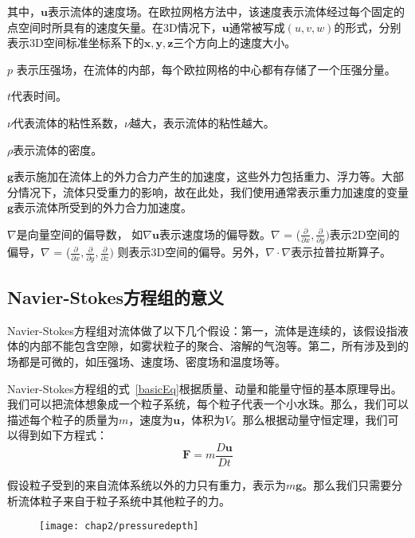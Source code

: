 其中，\(\boldsymbol u\)表示流体的速度场。在欧拉网格方法中，该速度表示流体经过每个固定的点空间时所具有的速度矢量。在3D情况下，\(\boldsymbol u\)通常被写成\((u,v,w)\)的形式，分别表示3D空间标准坐标系下的\(\boldsymbol{x}, \boldsymbol{y}, \boldsymbol{z}\)三个方向上的速度大小。
 
\(p\) 表示压强场，在流体的内部，每个欧拉网格的中心都有存储了一个压强分量。

\(t\)代表时间。
 
\(\nu\)代表流体的粘性系数，\(\nu\)越大，表示流体的粘性越大。
 
\(\rho\)表示流体的密度。
  
 \(\boldsymbol g\)表示施加在流体上的外力合力产生的加速度，这些外力包括重力、浮力等。大部分情况下，流体只受重力的影响，故在此处，我们使用通常表示重力加速度的变量\(\boldsymbol g\)表示流体所受到的外力合力加速度。
 
 \(\nabla\)是向量空间的偏导数， 如\(\nabla {\boldsymbol u}\)表示速度场的偏导数。\(\nabla\) = (\(\frac{\partial}{\partial x}, \frac{\partial}{\partial y})\)表示2D空间的偏导，\(\nabla\) = (\(\frac{\partial}{\partial x}, \frac{\partial}{\partial y}, \frac{\partial}{\partial z})\) 则表示3D空间的偏导。另外，\(\nabla \cdot \nabla\)表示拉普拉斯算子。

\subsection{Navier-Stokes方程组的意义}
\label{sec:eqmeaning}

Navier-Stokes方程组对流体做了以下几个假设：第一，流体是连续的，该假设指液体的内部不能包含空隙，如雾状粒子的聚合、溶解的气泡等。第二，所有涉及到的场都是可微的，如压强场、速度场、密度场和温度场等。

Navier-Stokes方程组的式~\ref{basicEq}根据质量、动量和能量守恒的基本原理导出。我们可以把流体想象成一个粒子系统，每个粒子代表一个小水珠。那么，我们可以描述每个粒子的质量为\(m\)，速度为\(\boldsymbol u\)，体积为\(V\)。那么根据动量守恒定理，我们可以得到如下方程式：
\begin{equation}
\label{momentum}
 {\boldsymbol F} = m\frac{D{\boldsymbol u}}{D{t}}
\end{equation}

假设粒子受到的来自流体系统以外的力只有重力，表示为\(m{\boldsymbol g}\)。那么我们只需要分析流体粒子来自于粒子系统中其他粒子的力。

\begin{figure}[ht]
  \centering
   \texttt{[image: chap2/pressuredepth]}
\end{figure}

